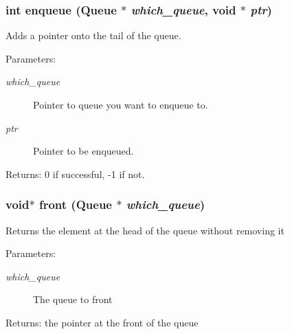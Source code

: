 \subsubsection{\setlength{\rightskip}{0pt plus 5cm}int enqueue (\bf{Queue} $\ast$ {\em which\_\-queue}, void $\ast$ {\em ptr})}\label{queue_8h_1d57a1b76a1967de5c006ed78777e65f}


Adds a pointer onto the tail of the queue. \begin{Desc}
\item[Parameters:]
\begin{description}
\item[{\em which\_\-queue}]Pointer to queue you want to enqueue to. \item[{\em ptr}]Pointer to be enqueued. \end{description}
\end{Desc}
\begin{Desc}
\item[Returns:]0 if successful, -1 if not. \end{Desc}
\subsubsection{\setlength{\rightskip}{0pt plus 5cm}void$\ast$ front (\bf{Queue} $\ast$ {\em which\_\-queue})}\label{queue_8h_afbf7ed14373984ccc9fa2f9ac776b7a}


Returns the element at the head of the queue without removing it \begin{Desc}
\item[Parameters:]
\begin{description}
\item[{\em which\_\-queue}]The queue to front \end{description}
\end{Desc}
\begin{Desc}
\item[Returns:]the pointer at the front of the queue \end{Desc}
